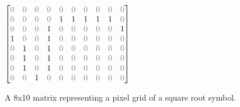 \begin{figure}[H]
    \begin{center}
    $
    \begin{bmatrix} %
        \textcolor{gray}{0} & \textcolor{gray}{0} & \textcolor{gray}{0} & \textcolor{gray}{0} & \textcolor{gray}{0} & \textcolor{gray}{0} & \textcolor{gray}{0} & \textcolor{gray}{0} & \textcolor{gray}{0} & \textcolor{gray}{0} \\
        \textcolor{gray}{0} & \textcolor{gray}{0} & \textcolor{gray}{0} & \textcolor{gray}{0} & 1 & 1 & 1 & 1 & 1 & \textcolor{gray}{0} \\
        \textcolor{gray}{0} & \textcolor{gray}{0} & \textcolor{gray}{0} & 1 & \textcolor{gray}{0} & \textcolor{gray}{0} & \textcolor{gray}{0} & \textcolor{gray}{0} & \textcolor{gray}{0} & 1 \\
        1 & \textcolor{gray}{0} & \textcolor{gray}{0} & 1 & \textcolor{gray}{0} & \textcolor{gray}{0} & \textcolor{gray}{0} & \textcolor{gray}{0} & \textcolor{gray}{0} & \textcolor{gray}{0} \\
        \textcolor{gray}{0} & 1 & \textcolor{gray}{0} & 1 & \textcolor{gray}{0} & \textcolor{gray}{0} & \textcolor{gray}{0} & \textcolor{gray}{0} & \textcolor{gray}{0} & \textcolor{gray}{0} \\
        \textcolor{gray}{0} & 1 & \textcolor{gray}{0} & 1 & \textcolor{gray}{0} & \textcolor{gray}{0} & \textcolor{gray}{0} & \textcolor{gray}{0} & \textcolor{gray}{0} & \textcolor{gray}{0} \\
        \textcolor{gray}{0} & 1 & \textcolor{gray}{0} & 1 & \textcolor{gray}{0} & \textcolor{gray}{0} & \textcolor{gray}{0} & \textcolor{gray}{0} & \textcolor{gray}{0} & \textcolor{gray}{0} \\
        \textcolor{gray}{0} & \textcolor{gray}{0} & 1 & \textcolor{gray}{0} & \textcolor{gray}{0} & \textcolor{gray}{0} & \textcolor{gray}{0} & \textcolor{gray}{0} & \textcolor{gray}{0} & \textcolor{gray}{0} \\

    \end{bmatrix}
    $
    \end{center}
    \caption{A 8x10 matrix representing a pixel grid of a square root symbol.}
    \label{fig:sqrt_matrix}
\end{figure}



